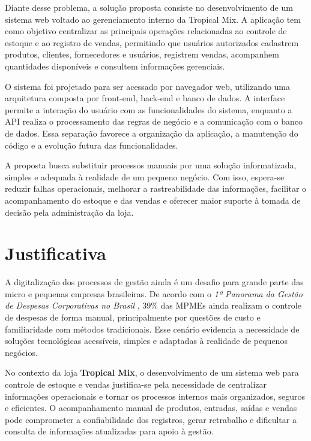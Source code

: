 Diante desse problema, a solução proposta consiste no desenvolvimento de um sistema web voltado ao gerenciamento interno da Tropical Mix. A aplicação tem como objetivo centralizar as principais operações relacionadas ao controle de estoque e ao registro de vendas, permitindo que usuários autorizados cadastrem produtos, clientes, fornecedores e usuários, registrem vendas, acompanhem quantidades disponíveis e consultem informações gerenciais.

O sistema foi projetado para ser acessado por navegador web, utilizando uma arquitetura composta por front-end, back-end e banco de dados. A interface permite a interação do usuário com as funcionalidades do sistema, enquanto a API realiza o processamento das regras de negócio e a comunicação com o banco de dados. Essa separação favorece a organização da aplicação, a manutenção do código e a evolução futura das funcionalidades.

A proposta busca substituir processos manuais por uma solução informatizada, simples e adequada à realidade de um pequeno negócio. Com isso, espera-se reduzir falhas operacionais, melhorar a rastreabilidade das informações, facilitar o acompanhamento do estoque e das vendas e oferecer maior suporte à tomada de decisão pela administração da loja.

\section{Justificativa}

A digitalização dos processos de gestão ainda é um desafio para grande parte das micro e pequenas empresas brasileiras. De acordo com o \textit{1º Panorama da Gestão de Despesas Corporativas no Brasil} \cite{contasimples2025}, 39\% das MPMEs ainda realizam o controle de despesas de forma manual, principalmente por questões de custo e familiaridade com métodos tradicionais. Esse cenário evidencia a necessidade de soluções tecnológicas acessíveis, simples e adaptadas à realidade de pequenos negócios.

No contexto da loja \textbf{Tropical Mix}, o desenvolvimento de um sistema web para controle de estoque e vendas justifica-se pela necessidade de centralizar informações operacionais e tornar os processos internos mais organizados, seguros e eficientes. O acompanhamento manual de produtos, entradas, saídas e vendas pode comprometer a confiabilidade dos registros, gerar retrabalho e dificultar a consulta de informações atualizadas para apoio à gestão.

